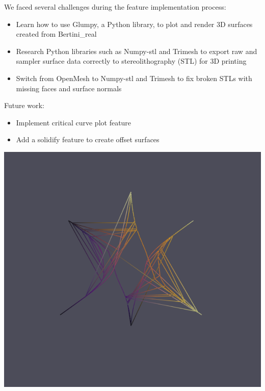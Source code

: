 \documentclass[paperwidth=46in, paperheight = 33.11in]{baposter}%
\begin{document}
\begin{poster}
{\begin{center}
\begin{minipage}[t]{0.90\linewidth}
We faced several challenges during the feature implementation process: 
\vspace{1mm}
\small
\begin{itemize}
\item \parbox[t]{\dimexpr\textwidth-\leftmargin}{%
Learn how to use Glumpy, a Python library, to plot and render 3D surfaces created from Bertini\_real
}
\vspace{1mm}
\item \parbox[t]{\dimexpr\textwidth-\leftmargin}{%
Research Python libraries such as Numpy-stl and Trimesh to export raw and sampler surface data correctly to stereolithography (STL)  for 3D printing 
}
\vspace{1mm}
\item \parbox[t]{\dimexpr\textwidth-\leftmargin}{%
Switch from OpenMesh to Numpy-stl and Trimesh to fix broken STLs with missing faces and surface normals 
}

\end{itemize}



\vspace{4mm}
Future work:
\small
\begin{itemize}
\item \parbox[t]{\dimexpr\textwidth-\leftmargin}{%
         Implement critical curve plot feature 
}
\item \parbox[t]{\dimexpr\textwidth-\leftmargin}{%
          Add a solidify feature to create offset surfaces
}
\end{itemize}

\vspace{4mm}
\begin{minipage}[t]{0.48\linewidth}
\includegraphics[width=1.05\linewidth,height= 0.80\linewidth]{pictures/fail_crit_curve}
\begin{center}


\end{center}
\end{minipage}
\end{minipage}
\end{center}}
\end{poster}
\end{document}
